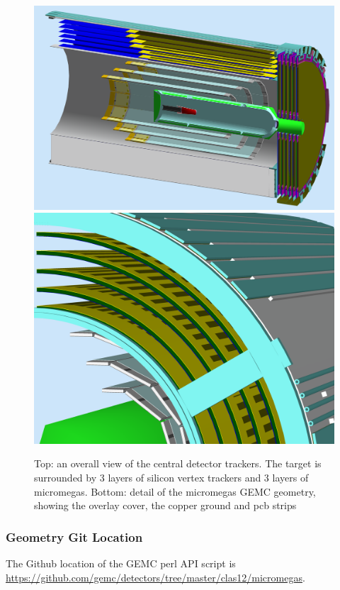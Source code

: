 \begin{figure}
	\centering
	\includegraphics[width=0.95\columnwidth,keepaspectratio]{img/bmtGeometry.png}
	\includegraphics[width=0.95\columnwidth,keepaspectratio]{img/bmtDetail.png}
	\caption{Top: an overall view of the central detector trackers. The target is surrounded by 3 layers of silicon vertex trackers and
            3 layers of micromegas. Bottom: detail of the micromegas GEMC geometry, showing the overlay cover, the copper ground and pcb strips}
	\label{fig:bmtGeometry}
\end{figure}



\subsubsection{Geometry Git Location}
The Github location of the GEMC perl API script is \url{https://github.com/gemc/detectors/tree/master/clas12/micromegas}.


